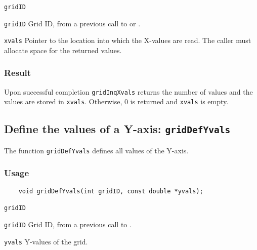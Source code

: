 \hspace*{4mm}\begin{minipage}[]{15cm}
\begin{deflist}{\texttt{gridID}\ }
\item[\texttt{gridID}]
Grid ID, from a previous call to {} or {}.
\item[\texttt{xvals}]
Pointer to the location into which the X-values are read.
                    The caller must allocate space for the returned values.

\end{deflist}
\end{minipage}

\subsubsection*{Result}

Upon successful completion {\texttt{gridInqXvals}} returns the number of values and
the values are stored in {\texttt{xvals}}.
Otherwise, 0 is returned and {\texttt{xvals}} is empty.



\subsection{Define the values of a Y-axis: \texttt{gridDefYvals}}
\label{gridDefYvals}

The function {\texttt{gridDefYvals}} defines all values of the Y-axis.

\subsubsection*{Usage}

\begin{verbatim}
    void gridDefYvals(int gridID, const double *yvals);
\end{verbatim}

\hspace*{4mm}\begin{minipage}[]{15cm}
\begin{deflist}{\texttt{gridID}\ }
\item[\texttt{gridID}]
Grid ID, from a previous call to {}.
\item[\texttt{yvals}]
Y-values of the grid.

\end{deflist}
\end{minipage}


